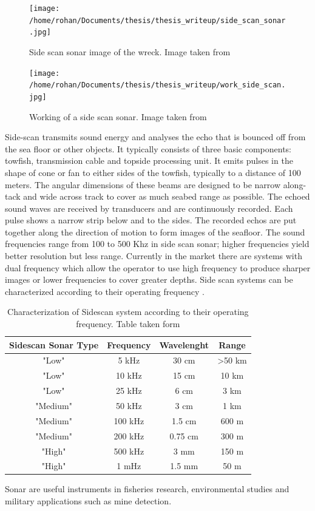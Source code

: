 \documentclass[12pt]{dalcsthesis}
\begin{document}
\begin{figure}[!ht]
  \centering
     {\texttt{[image: /home/rohan/Documents/thesis/thesis\_writeup/side\_scan\_sonar.jpg]}}
  \caption{\label{fig- side scan sonar image} Side scan sonar image of the wreck. Image taken from \cite{side_sonar_url}}
\end{figure}

\begin{figure}[!ht]
  \centering
     {\texttt{[image: /home/rohan/Documents/thesis/thesis\_writeup/work\_side\_scan.jpg]}}
  \caption{\label{fig- side scan sonar working} Working of a side scan sonar. Image taken from \cite{side_sonar_url}}
\end{figure}

Side-scan transmits sound energy and analyses the echo that is bounced off from the sea floor or other objects. It typically consists of three basic components: towfish, transmission cable and topside processing unit. It emits pulses in the shape of cone or fan to either sides of the towfish, typically to a distance of 100 meters. The angular dimensions of these beams are designed to be narrow along-tack and wide across track to cover as much seabed range as possible.  The echoed sound waves are received by transducers and are continuously recorded. Each pulse shows a narrow strip below and to the sides.  The recorded echos are put together along the direction of motion to form images of the seafloor. The sound frequencies range from 100 to 500 Khz in side scan sonar; higher frequencies yield better resolution but less range. Currently in the market there are systems with dual frequency which allow the operator to use high frequency to produce sharper images or lower frequencies to cover greater depths. Side scan 
systems can be characterized according to their operating frequency \cite{side_sonar_usgs_url}.

\begin{table}
\centering
\begin{tabular}{|c|c|c|c|}
\hline 
Sidescan Sonar Type & Frequency & Wavelenght & Range \\ 
\hline 
"Low" & 5 kHz & 30 cm & >50 km \\ 
\hline 
"Low" & 10 kHz & 15 cm & 10 km \\ 
\hline 
"Low" & 25 kHz & 6 cm & 3 km \\ 
\hline 
"Medium" & 50 kHz & 3 cm & 1 km \\ 
\hline 
"Medium" & 100 kHz & 1.5 cm & 600 m \\ 
\hline 
"Medium" & 200 kHz & 0.75 cm & 300 m \\ 
\hline 
"High" & 500 kHz & 3 mm & 150 m \\ 
\hline 
"High" & 1 mHz & 1.5 mm & 50 m \\ 
\hline 
\end{tabular} 
\caption{\label{tab-: classification of side scan} Characterization of Sidescan system according to their operating frequency. Table taken form \cite{side_sonar_usgs_url}} 
\end{table}
Sonar are useful instruments in fisheries research, environmental studies and military applications such as mine detection. 
\end{document}
